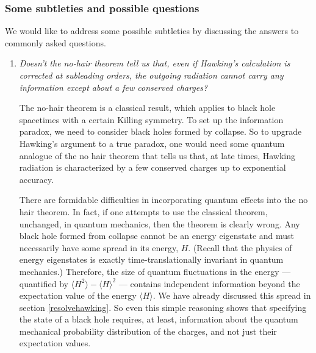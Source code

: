 \documentclass[12pt]{article}
\begin{document}
\subsubsection{Some subtleties and possible questions \label{oldinfosubtle}}
We would like to address some possible subtleties by discussing the answers to commonly asked questions.
\begin{enumerate}[label={\bf Q\arabic*}, series=qseries]
\item
{\em Doesn't the no-hair theorem tell us that, even if Hawking's calculation is corrected at subleading orders, the outgoing radiation cannot carry any information except about a few conserved charges?}

The no-hair theorem  is a classical result,
 which applies to black hole spacetimes with a certain Killing symmetry. To set up the information paradox, we need to consider black holes formed by collapse. So to upgrade Hawking's argument to a true paradox, one would need some quantum analogue of the no hair theorem that tells us that, at late times, Hawking radiation is characterized by 
a few conserved charges up to exponential accuracy.
 
There are formidable difficulties in incorporating quantum effects into the no hair theorem. In fact, if one attempts to use the classical theorem, unchanged, in quantum mechanics, then the theorem is clearly wrong. Any black hole formed from collapse cannot be an energy eigenstate and must necessarily have some spread in its energy, $H$. (Recall that the physics of energy eigenstates is exactly time-translationally invariant in quantum mechanics.)  Therefore, the size of quantum fluctuations in the energy --- quantified by $\langle H^2 \rangle - \langle H \rangle^2$  --- contains independent information beyond the expectation value of the energy $\langle H \rangle$. We have already discussed this spread in section \ref{resolvehawking}.
So even this simple reasoning shows that specifying the state of a black hole  requires, at least,  information about the quantum mechanical probability distribution of the charges, and not just their expectation values.


\end{enumerate}
\end{document}
